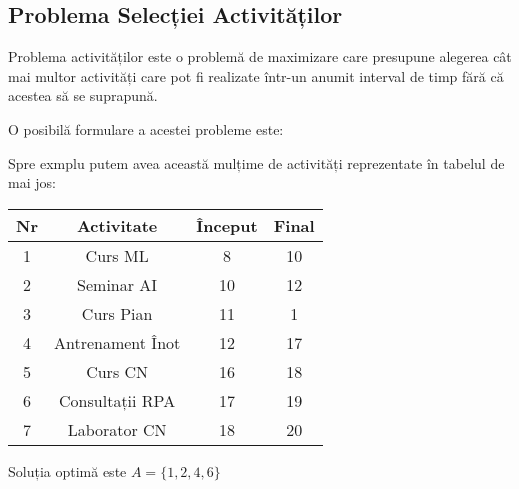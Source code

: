\subsection{Problema Selecției Activităților}	
Problema activităților este o problemă de maximizare care presupune alegerea cât mai multor activități care pot fi realizate într-un anumit interval de timp fără că acestea să se suprapună.
\vspace{0.5cm}
\par	 
O posibilă formulare a acestei probleme este: \par
{}

\par
\vspace{1cm}
Spre exmplu putem avea această mulțime de activități reprezentate în tabelul de mai jos:
\begin{table}[h!]
	\centering
	\begin{tabular}{||c c c c||} 
		\hline
		Nr & Activitate & Început & Final \\ [1ex] 
		\hline\hline
		1 & Curs ML & 8 & 10\\ \hline
		2 & Seminar AI & 10 & 12 \\\hline
		3 & Curs Pian & 11 & 1 \\\hline
		4 & Antrenament Înot & 12 & 17 \\ \hline
		5 & Curs CN & 16 & 18 \\\hline
		6 & Consultații RPA & 17 & 19 \\ \hline
		7 & Laborator CN & 18 & 20 \\ [1ex] 
		\hline
	\end{tabular}
\end{table}
\par
Soluția optimă este $A = \{1, 2, 4, 6  \} $


